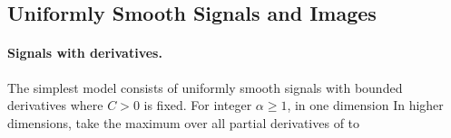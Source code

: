                                            
\subsection{Uniformly Smooth Signals and Images}
\label{subsec-smooth-class}

  
\paragraph{Signals with derivatives.}

The simplest model consists of uniformly smooth signals with bounded derivatives
where $C>0$ is fixed. For integer $\alpha\geq1$, in one dimension
In higher dimensions, take the maximum over all partial derivatives of to